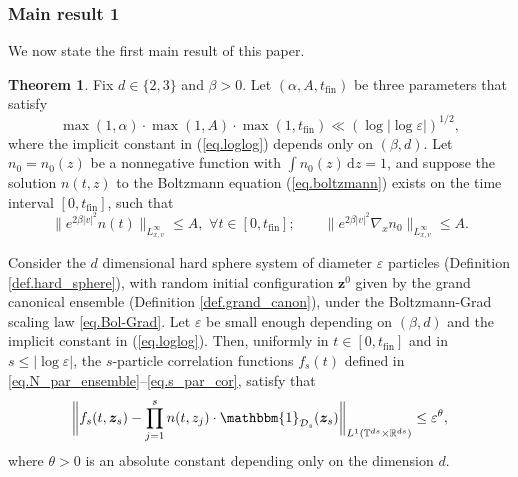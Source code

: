 \documentclass[10pt, reqno]{amsart}
\newcommand{\Rb}{\mathbb R}
\newcommand{\Tb}{\mathbb T}
\newcommand{\Dc}{\mathcal D}
\newcommand{\vz}{\boldsymbol{z}}
\theoremstyle{definition}
\newtheorem{mainthm}{Theorem}
\theoremstyle{remark}
\numberwithin{equation}{section}
\begin{document}
\subsubsection{Main result 1} We now state the first main result of this paper.
\begin{mainthm}\label{th.main} Fix $d\in\{2,3\}$ and $\beta>0$. Let $(\alpha,A,t_{\mathrm{fin}})$ be three parameters that satisfy
\begin{equation}\label{eq.loglog}
\max(1,\alpha)\cdot\max(1,A)\cdot\max(1,t_{\mathrm{fin}})\ll (\log|\log\varepsilon|)^{1/2},
\end{equation} where the implicit constant in (\ref{eq.loglog}) depends only on $(\beta,d)$. Let $n_0=n_0(z)$ be a nonnegative function with $\int n_0(z)\,\mathrm{d}z=1$, and suppose the solution $n(t,z)$ to the Boltzmann equation (\ref{eq.boltzmann}) exists on the time interval $[0,t_{\mathrm{fin}}]$, such that
\begin{equation}\label{eq.boltzmann_decay_1}
\big\|e^{2\beta  |v|^2}n(t)\big\|_{L_{x,v}^\infty}\leq A,\,\,\forall t\in[0,t_{\mathrm{fin}}];\qquad \big\|e^{2\beta  |v|^2}\nabla_xn_0\big\|_{L_{x,v}^\infty}\leq A.
\end{equation}

Consider the $d$ dimensional hard sphere system of diameter $\varepsilon$ particles (Definition \ref{def.hard_sphere}), with random initial configuration $\vz^0$ given by the grand canonical ensemble (Definition \ref{def.grand_canon}), under the Boltzmann-Grad scaling law \eqref{eq.Bol-Grad}. Let $\varepsilon$ be small enough depending on $(\beta,d)$ and the implicit constant in (\ref{eq.loglog}). Then, uniformly in $t\in[0,t_{\mathrm{fin}}]$ and in $s\leq |\log\varepsilon|$, the $s$-particle correlation functions $f_s(t)$ defined in \eqref{eq.N_par_ensemble}--\eqref{eq.s_par_cor}, satisfy that
\begin{equation}\label{eq.maineqn}
\bigg\|f_s(t,\vz_s)-\prod_{j=1}^s n(t,z_j)\cdot \mathbbm{1}_{\Dc_s}(\vz_s)\bigg\|_{L^1(\Tb^{ds}\times\Rb^{ds})}\leq \varepsilon^\theta,
\end{equation} where $\theta>0$ is an absolute constant depending only on the dimension $d$. 
\end{mainthm}
\end{document}
